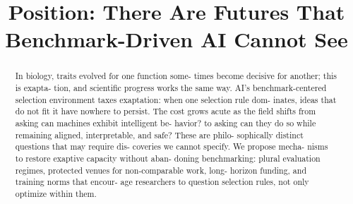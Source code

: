 \title{Position: There Are Futures That Benchmark-Driven AI Cannot See}

\maketitle

\begin{abstract}
In biology, traits evolved for one function some- times become decisive for another; this is exapta- tion, and scientific progress works the same way. AI’s benchmark-centered selection environment taxes exaptation: when one selection rule dom- inates, ideas that do not fit it have nowhere to persist. The cost grows acute as the field shifts from asking can machines exhibit intelligent be- havior? to asking can they do so while remaining aligned, interpretable, and safe? These are philo- sophically distinct questions that may require dis- coveries we cannot specify. We propose mecha- nisms to restore exaptive capacity without aban- doning benchmarking: plural evaluation regimes, protected venues for non-comparable work, long- horizon funding, and training norms that encour- age researchers to question selection rules, not only optimize within them.
\end{abstract}

